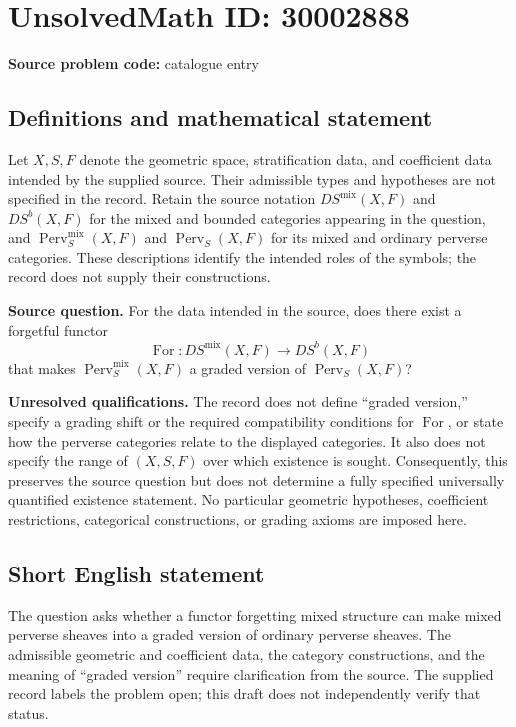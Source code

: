 \documentclass[11pt]{article}
\begin{document}
\section*{UnsolvedMath ID: 30002888}
\textbf{Source problem code:} catalogue entry
\subsection{Definitions and mathematical statement}
Let \(X,S,F\) denote the geometric space, stratification data, and coefficient data intended by the supplied source. Their admissible types and hypotheses are not specified in the record. Retain the source notation \(DS^{\mathrm{mix}}(X,F)\) and \(DS^b(X,F)\) for the mixed and bounded categories appearing in the question, and \(\operatorname{Perv}^{\mathrm{mix}}_S(X,F)\) and \(\operatorname{Perv}_S(X,F)\) for its mixed and ordinary perverse categories. These descriptions identify the intended roles of the symbols; the record does not supply their constructions.

\textbf{Source question.} For the data intended in the source, does there exist a forgetful functor
\[
\operatorname{For}\colon DS^{\mathrm{mix}}(X,F)\longrightarrow DS^b(X,F)
\]
that makes \(\operatorname{Perv}^{\mathrm{mix}}_S(X,F)\) a graded version of \(\operatorname{Perv}_S(X,F)\)?

\textbf{Unresolved qualifications.} The record does not define ``graded version,'' specify a grading shift or the required compatibility conditions for \(\operatorname{For}\), or state how the perverse categories relate to the displayed categories. It also does not specify the range of \((X,S,F)\) over which existence is sought. Consequently, this preserves the source question but does not determine a fully specified universally quantified existence statement. No particular geometric hypotheses, coefficient restrictions, categorical constructions, or grading axioms are imposed here.
\subsection{Short English statement}
The question asks whether a functor forgetting mixed structure can make mixed perverse sheaves into a graded version of ordinary perverse sheaves. The admissible geometric and coefficient data, the category constructions, and the meaning of ``graded version'' require clarification from the source. The supplied record labels the problem open; this draft does not independently verify that status.
\end{document}
